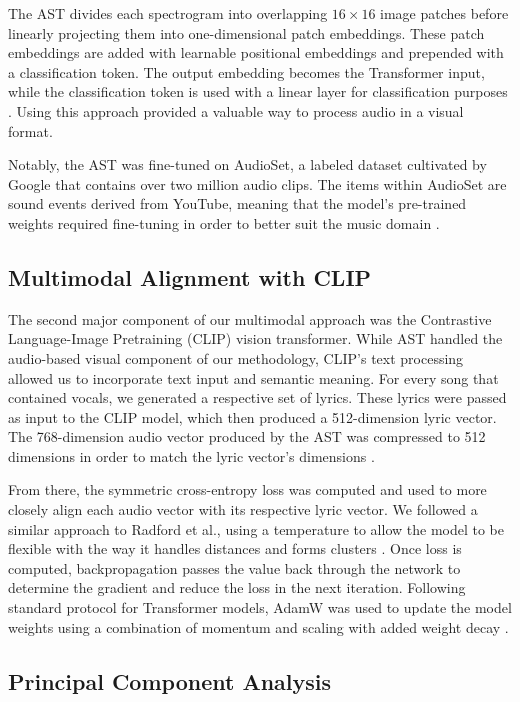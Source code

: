 The AST divides each spectrogram into overlapping $16 \times 16$ image patches before linearly projecting them into one-dimensional patch embeddings. These patch embeddings are added with learnable positional embeddings and prepended with a classification token. The output embedding becomes the Transformer input, while the classification token is used with a linear layer for classification purposes \cite{AST}. Using this approach provided a valuable way to process audio in a visual format.

Notably, the AST was fine-tuned on AudioSet, a labeled dataset cultivated by Google that contains over two million audio clips. The items within AudioSet are sound events derived from YouTube, meaning that the model’s pre-trained weights required fine-tuning in order to better suit the music domain \cite{audioset}.

\subsection{Multimodal Alignment with CLIP}

The second major component of our multimodal approach was the Contrastive Language-Image Pretraining (CLIP) vision transformer. While  AST handled the audio-based visual component of our methodology, CLIP’s text processing allowed us to incorporate text input and semantic meaning. For every song that contained vocals, we generated a respective set of lyrics. These lyrics were passed as input to the CLIP model, which then produced a 512-dimension lyric vector. The 768-dimension audio vector produced by the AST was compressed to 512 dimensions in order to match the lyric vector’s dimensions \cite{CLIP}.

From there, the symmetric cross-entropy loss was computed and used to more closely align each audio vector with its respective lyric vector. We followed a similar approach to Radford et al., using a temperature to allow the model to be flexible with the way it handles distances and forms clusters \cite{CLIP}. Once loss is computed, backpropagation passes the value back through the network to determine the gradient and reduce the loss in the next iteration. Following standard protocol for Transformer models, AdamW was used to update the model weights using a combination of momentum and scaling with added weight decay \cite{adamW}.

\subsection{Principal Component Analysis}

